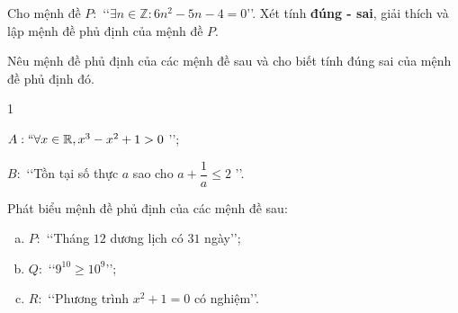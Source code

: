 \begin{bt}%
	Cho mệnh đề $P\colon$ \lq\lq$\exists  n\in \mathbb{Z}:6n^2-5n-4=0$\rq\rq.
	Xét tính \textbf{đúng - sai}, giải thích  và lập mệnh đề phủ định của mệnh đề $P$.
\end{bt}

\begin{bt}%
	Nêu mệnh đề phủ định của các mệnh đề sau và cho biết tính đúng sai của mệnh  đề phủ định đó.
	\begin{enumEX}{1}
		\item $A: \lq\lq \forall  x\in\mathbb{R}, x^3-x^2+1>0$ \rq\rq;
		\item $B:$ \lq\lq Tồn tại số thực $a$ sao cho $a+\dfrac 1 a\leq 2$ \rq\rq. 
	\end{enumEX}
\end{bt}

\begin{bt}%
	Phát biểu mệnh đề phủ định  của các mệnh đề sau:
	\begin{enumerate}[a)]
		\item $P\colon$ \lq\lq Tháng $12$ dương lịch  có $31$ ngày\rq\rq;
		\item $Q\colon$ \lq\lq  $9^{10} \ge 10^9$\rq\rq;
		\item  $R\colon$ \lq\lq Phương trình $x^2+1=0$ có nghiệm\rq\rq.
	\end{enumerate}
\end{bt}

